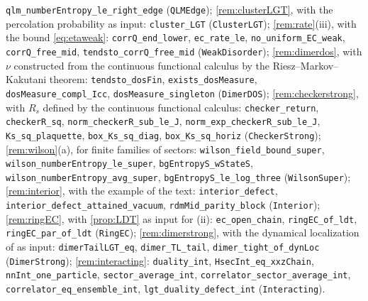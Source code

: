 \begin{itemize}[leftmargin=1.5em,itemsep=1pt]
\texttt{qlm\_numberEntropy\_le\_right\_edge} (\texttt{QLMEdge}); \cref{rem:clusterLGT}, with the percolation probability
as input: \texttt{cluster\_LGT} (\texttt{ClusterLGT}); \cref{rem:rate}(iii), with the bound
\eqref{eq:etaweak}: \texttt{corrQ\_end\_lower}, \texttt{ec\_rate\_le}, \texttt{no\_uniform\_EC\_weak},
\texttt{corrQ\_free\_mid}, \texttt{tendsto\_corrQ\_free\_mid} (\texttt{WeakDisorder}); \cref{rem:dimerdos}, with $\nu$
constructed from the continuous functional calculus by the Riesz--Markov--Kakutani theorem: \texttt{tendsto\_dosFin},
\texttt{exists\_dosMeasure}, \texttt{dosMeasure\_compl\_Icc}, \texttt{dosMeasure\_singleton} (\texttt{DimerDOS});
\cref{rem:checkerstrong}, with $R_s$ defined by the continuous functional calculus: \texttt{checker\_return},
\texttt{checkerR\_sq}, \texttt{norm\_checkerR\_sub\_le\_J}, \texttt{norm\_exp\_checkerR\_sub\_le\_J}, \texttt{Ks\_sq\_plaquette},
\texttt{box\_Ks\_sq\_diag}, \texttt{box\_Ks\_sq\_horiz} (\texttt{CheckerStrong}); \cref{rem:wilson}(a), for finite families of
sectors: \texttt{wilson\_field\_bound\_super}, \texttt{wilson\_numberEntropy\_le\_super}, \texttt{bgEntropyS\_wStateS},
\texttt{wilson\_numberEntropy\_avg\_super}, \texttt{bgEntropyS\_le\_log\_three} (\texttt{WilsonSuper}); \cref{rem:interior}, with the
example of the text: \texttt{interior\_defect}, \texttt{interior\_defect\_attained\_vacuum}, \texttt{rdmMid\_parity\_block}
(\texttt{Interior}); \cref{rem:ringEC}, with \cref{prop:LDT} as input for (ii): \texttt{ec\_open\_chain},
\texttt{ringEC\_of\_ldt}, \texttt{ringEC\_par\_of\_ldt} (\texttt{RingEC}); \cref{rem:dimerstrong}, with the dynamical
localization of \cite{DeBievreGerminet2000} as input: \texttt{dimerTailLGT\_eq}, \texttt{dimer\_TL\_tail},
\texttt{dimer\_tight\_of\_dynLoc} (\texttt{DimerStrong}); \cref{rem:interacting}: \texttt{duality\_int},
\texttt{HsecInt\_eq\_xxzChain}, \texttt{nnInt\_one\_particle}, \texttt{sector\_average\_int},
\texttt{correlator\_sector\_average\_int}, \texttt{correlator\_eq\_ensemble\_int}, \texttt{lgt\_duality\_defect\_int}
(\texttt{Interacting}).
\end{itemize}

